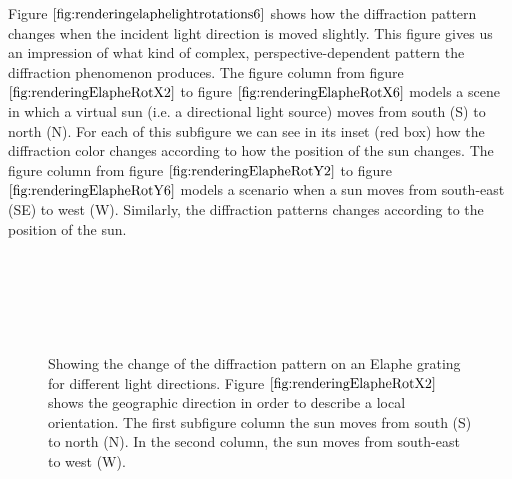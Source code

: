 Figure $\ref{fig:renderingelaphelightrotations6}$ shows how the diffraction pattern changes when the incident light direction is moved slightly. This figure gives us an impression of what kind of complex, perspective-dependent pattern the diffraction phenomenon produces. The figure column from figure $\ref{fig:renderingElapheRotX2}$ to figure $\ref{fig:renderingElapheRotX6}$ models a scene in which a virtual sun (i.e. a directional light source) moves from south (S) to north (N). For each of this subfigure we can see in its inset (red box) how the diffraction color changes according to how the position of the sun changes. The figure column from figure $\ref{fig:renderingElapheRotY2}$ to figure $\ref{fig:renderingElapheRotY6}$ models a scenario when a sun moves from south-east (SE) to west (W). Similarly, the diffraction patterns changes according to the position of the sun.

\begin{figure}[H]
  \centering
  ~

  ~
 
  ~
  
\caption[Snake Renderings: FLSS Approach for varying Light Directions]{Showing the change of the diffraction pattern on an Elaphe grating for different light directions. Figure $\ref{fig:renderingElapheRotX2}$ shows the geographic direction in order to describe a local orientation. The first subfigure column the sun moves from south (S) to north (N). In the second column, the sun moves from south-east to west (W).}
\label{fig:renderingelaphelightrotations6}
\end{figure}

